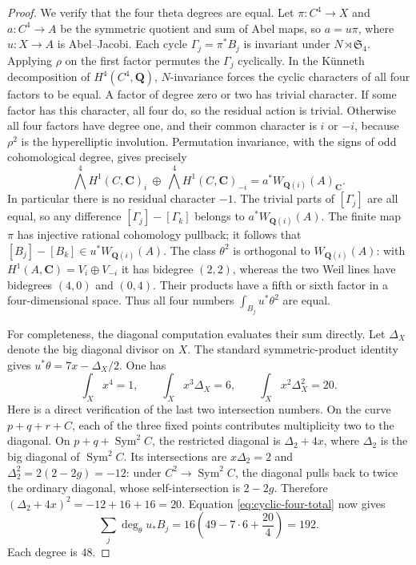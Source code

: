 \documentclass[11pt]{article}
\theoremstyle{definition}
\theoremstyle{remark}
\begin{document}
\begin{proof}
We verify that the four theta degrees are equal.  Let
$\pi:C^4\to X$ and $a:C^4\to A$ be the symmetric quotient and sum
of Abel maps, so $a=u\pi$, where $u:X\to A$ is Abel--Jacobi.
Each cycle $\Gamma_j=\pi^*B_j$ is invariant under $N\rtimes\mathfrak S_4$.
Applying $\rho$ on the first factor permutes the $\Gamma_j$ cyclically.
In the K\"unneth decomposition of $H^4(C^4,\mathbf Q)$, $N$-invariance
forces the cyclic characters of all four factors to be equal.  A factor
of degree zero or two has trivial character.  If some factor has this
character, all four do, so the residual action is trivial.  Otherwise
all four factors have degree one, and their common character is $i$ or
$-i$, because $\rho^2$ is the hyperelliptic involution.  Permutation
invariance, with the signs of odd cohomological degree, gives precisely
\[
 \bigwedge^4H^1(C,\mathbf C)_i\ \oplus\
 \bigwedge^4H^1(C,\mathbf C)_{-i}=a^*W_{\mathbf Q(i)}(A)_{\mathbf C}.
\]
In particular there is no residual character $-1$.  The trivial parts
of $[\Gamma_j]$ are all equal, so any difference
$[\Gamma_j]-[\Gamma_k]$ belongs to $a^*W_{\mathbf Q(i)}(A)$.
The finite map $\pi$ has injective rational cohomology pullback; it
follows that $[B_j]-[B_k]\in u^*W_{\mathbf Q(i)}(A)$.
The class $\theta^2$ is orthogonal to $W_{\mathbf Q(i)}(A)$: with
$H^1(A,\mathbf C)=V_i\oplus V_{-i}$ it has bidegree $(2,2)$,
whereas the two Weil lines have bidegrees $(4,0)$ and $(0,4)$.
Their products have a fifth or sixth factor in a four-dimensional
space.  Thus all four numbers $\int_{B_j}u^*\theta^2$ are equal.

For completeness, the diagonal computation evaluates their sum directly.
Let $\Delta_X$ denote the big diagonal divisor on $X$.  The standard
symmetric-product identity gives $u^*\theta=7x-\Delta_X/2$.
One has
\[
 \int_X x^4=1,\qquad
 \int_X x^3\Delta_X=6,\qquad
 \int_X x^2\Delta_X^2=20.
\]
Here is a direct verification of the last two intersection numbers.
On the curve $p+q+r+C$, each of the three fixed points contributes
multiplicity two to the diagonal.  On $p+q+\operatorname{Sym}^2C$,
the restricted diagonal is $\Delta_2+4x$, where $\Delta_2$ is the big
diagonal of $\operatorname{Sym}^2C$.  Its intersections are
$x\Delta_2=2$ and $\Delta_2^2=2(2-2g)=-12$: under
$C^2\to\operatorname{Sym}^2C$, the diagonal pulls back to twice the
ordinary diagonal, whose self-intersection is $2-2g$.
Therefore $(\Delta_2+4x)^2=-12+16+16=20$.  Equation
\eqref{eq:cyclic-four-total} now gives
\[
 \sum_j\deg_\theta u_*B_j
 =16\left(49-7\cdot6+\frac{20}{4}\right)=192.
\]
Each degree is $48$.


\end{proof}
\end{document}
